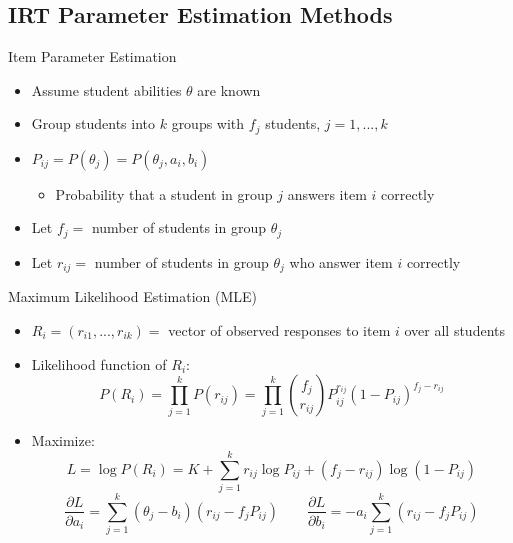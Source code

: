 \documentclass{beamer}
\theoremstyle{definition}
\begin{document}
\subsection{IRT Parameter Estimation Methods}

\begin{frame}{Item Parameter Estimation}
\begin{itemize}
  \item Assume student abilities $\theta$ are known
  \item Group students into $k$ groups with $f_j$ students, $j=1,...,k$
  \item<2-> $P_{ij} = P(\theta_j) = P(\theta_j, a_i, b_i)$
  \begin{itemize}
    \item<2-> Probability that a student in group $j$ answers item $i$ correctly
  \end{itemize}
  \item<3> Let $f_j = $ number of students in group $\theta_j$
  \item<3> Let $r_{ij} = $ number of students in group $\theta_j$ who answer item $i$ correctly
\end{itemize}
\end{frame}

\begin{frame}{Maximum Likelihood Estimation (MLE)}
\begin{itemize}
  
  \item $R_i = (r_{i1},...,r_{ik}) = $ vector of observed responses to item $i$ over all students
  \item Likelihood function of $R_i$:
  \[P(R_i) = \prod_{j=1}^k P(r_{ij}) = \prod_{j=1}^k \binom{f_j}{r_{ij}}P_{ij}^{r_{ij}} (1-P_{ij})^{f_j-r_{ij}}\]
  \item<2-> Maximize:
  \[L = \log P(R_i) = K + \sum_{j=1}^k  r_{ij}\log P_{ij} + (f_j-r_{ij})\log (1-P_{ij})\]
  \[\frac{\partial L}{\partial a_i} = \sum_{j=1}^k (\theta_j-b_i)(r_{ij} - f_j P_{ij}) \quad \quad
  \frac{\partial L}{\partial b_i} = -a_i\sum_{j=1}^k (r_{ij} - f_j P_{ij}) \]
\end{itemize}
\end{frame}
\end{document}
